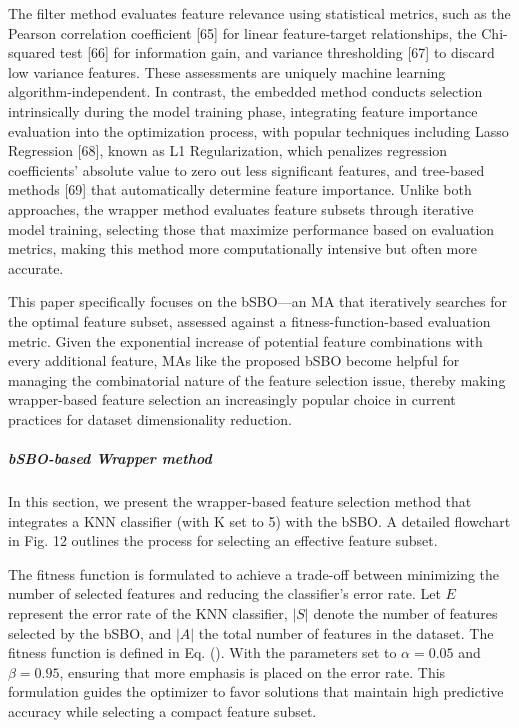 \documentclass{article} %
\begin{document}
The filter method evaluates feature relevance using statistical metrics, such as the Pearson correlation coefficient [65] for linear feature-target relationships, the Chi-squared test [66] for information gain, and variance thresholding [67] to discard low variance features. These assessments are uniquely machine learning algorithm-independent. In contrast, the embedded method conducts selection intrinsically during the model training phase, integrating feature importance evaluation into the optimization process, with popular techniques including Lasso Regression [68], known as L1 Regularization, which penalizes regression coefficients' absolute value to zero out less significant features, and tree-based methods [69] that automatically determine feature importance. Unlike both approaches, the wrapper method evaluates feature subsets through iterative model training, selecting those that maximize performance based on evaluation metrics, making this method more computationally intensive but often more accurate.

This paper specifically focuses on the bSBO---an MA that iteratively searches for the optimal feature subset, assessed against a fitness-function-based evaluation metric. Given the exponential increase of potential feature combinations with every additional feature, MAs like the proposed bSBO become helpful for managing the combinatorial nature of the feature selection issue, thereby making wrapper-based feature selection an increasingly popular choice in current practices for dataset dimensionality reduction.


\subparagraph{ bSBO-based Wrapper method}

In this section, we present the wrapper-based feature selection method that integrates a KNN classifier (with K set to 5) with the bSBO. A detailed flowchart in Fig. 12 outlines the process for selecting an effective feature subset.

The fitness function is formulated to achieve a trade-off between minimizing the number of selected features and reducing the classifier's error rate. Let $E$ represent the error rate of the KNN classifier, $|S|$ denote the number of features selected by the bSBO, and $|A|$ the total number of features in the dataset. The fitness function is defined in Eq. \left(\right). With the parameters set to $α=0.05$ and $β=0.95$, ensuring that more emphasis is placed on the error rate. This formulation guides the optimizer to favor solutions that maintain high predictive accuracy while selecting a compact feature subset.
\end{document}

